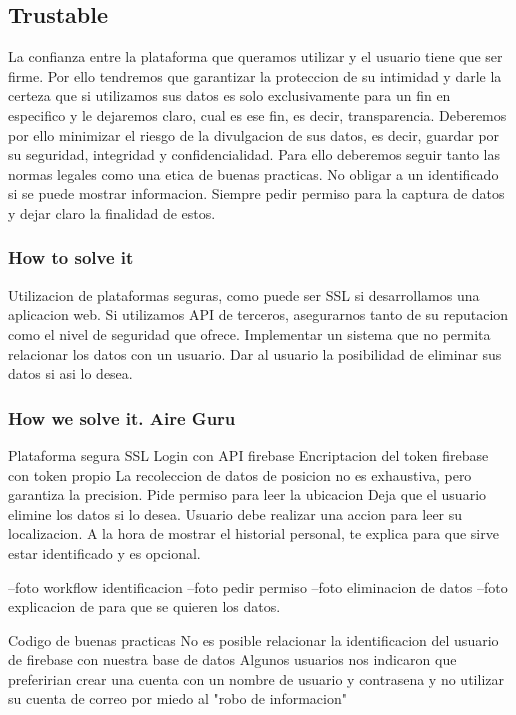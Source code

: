 \subsection{Trustable}
La confianza entre la plataforma que queramos utilizar y el usuario tiene que ser firme.
Por ello tendremos que garantizar la proteccion de su intimidad y darle la certeza que si 
utilizamos sus datos es solo exclusivamente para un fin en especifico y le dejaremos claro,
cual es ese fin, es decir, transparencia. 
Deberemos por ello minimizar el riesgo de la divulgacion de sus datos, es decir, guardar
por su seguridad, integridad y confidencialidad. 
Para ello deberemos seguir tanto las normas legales como una etica de buenas practicas.
No obligar a un identificado si se puede mostrar informacion.
Siempre pedir permiso para la captura de datos y dejar claro la finalidad de estos.


\subsubsection{How to solve it} 
Utilizacion de plataformas seguras, como puede ser SSL si desarrollamos una aplicacion web.
Si utilizamos API de terceros, asegurarnos tanto de su reputacion como el nivel de seguridad que ofrece.
Implementar un sistema que no permita relacionar los datos con un usuario.
Dar al usuario la posibilidad de eliminar sus datos si asi lo desea.


\subsubsection{How we solve it. Aire Guru} 
Plataforma segura SSL
Login con API firebase
Encriptacion del token firebase con token propio
La recoleccion de datos de posicion no es exhaustiva, pero garantiza la precision.
Pide permiso para leer la ubicacion
Deja que el usuario elimine los datos si lo desea.
Usuario debe realizar una accion para leer su localizacion.
A la hora de mostrar el historial personal, te explica para que sirve estar identificado y es opcional.

 --foto workflow identificacion
 --foto pedir permiso
 --foto eliminacion de datos
 --foto explicacion de para que se quieren los datos.
\begin{itemize}
    \done Codigo de buenas practicas
    \done No es posible relacionar la identificacion del usuario de firebase con nuestra base de datos
    \crossed Algunos usuarios nos indicaron que preferirian crear una cuenta con un nombre de usuario y contrasena
    y no utilizar su cuenta de correo por miedo al "robo de informacion"
    
\end{itemize}
\newpage